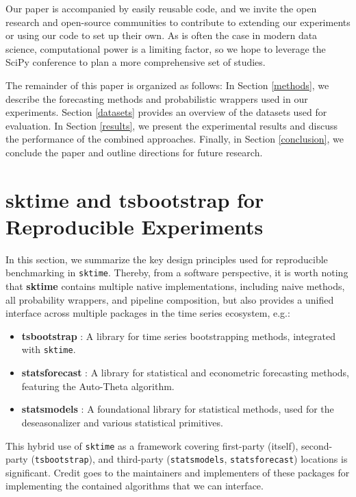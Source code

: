 Our paper is accompanied by easily reusable code, and we invite the open research and open-source communities to contribute to extending our experiments or using our code to set up their own. As is often the case in modern data science, computational power is a limiting factor, so we hope to leverage the SciPy conference to plan a more comprehensive set of studies.

The remainder of this paper is organized as follows: In Section \ref{methods}, we describe the forecasting methods and probabilistic wrappers used in our experiments. Section \ref{datasets} provides an overview of the datasets used for evaluation. In Section \ref{results}, we present the experimental results and discuss the performance of the combined approaches. Finally, in Section \ref{conclusion}, we conclude the paper and outline directions for future research.

\section{sktime and tsbootstrap for Reproducible Experiments}\label{sktime}

In this section, we summarize the key design principles used for reproducible benchmarking in \texttt{sktime}. Thereby, from a software perspective, it is  worth noting that \textbf{sktime} \cite{loning2019sktime, franz_kiraly_2024_11095261_sktime} contains multiple native implementations, including naive methods, all probability wrappers, and pipeline composition, but also provides a unified interface across multiple packages in the time series ecosystem, e.g.:

\begin{itemize}
    \item \textbf{tsbootstrap} \cite{gilda_2024_10866090_tsbootstrap, gilda2024tsbootstrap}: A library for time series bootstrapping methods, integrated with \texttt{sktime}.
    \item \textbf{statsforecast} \cite{garza2022statsforecast}: A library for statistical and econometric forecasting methods, featuring the Auto-Theta algorithm.
    \item \textbf{statsmodels} \cite{seabold2010statsmodels}: A foundational library for statistical methods, used for the deseasonalizer and various statistical primitives.
\end{itemize}

This hybrid use of \texttt{sktime} as a framework covering first-party (itself), second-party (\texttt{tsbootstrap}), and third-party (\texttt{statsmodels}, \texttt{statsforecast}) locations is significant.
Credit goes to the maintainers and implementers of these packages for implementing the contained algorithms that we can interface.


